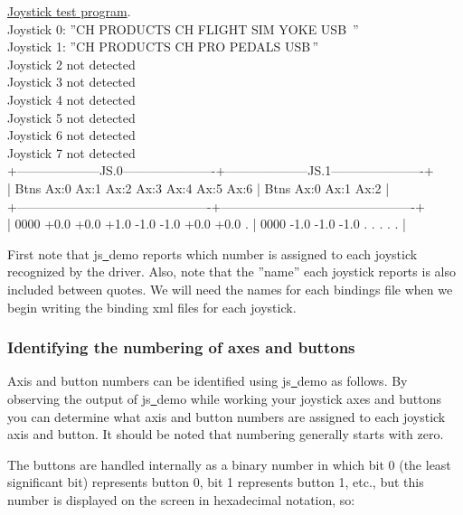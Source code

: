 \begin{ttfamily}
\tiny
\noindent
\underline{Joystick test program}.\\
Joystick 0: ''CH PRODUCTS CH FLIGHT SIM YOKE USB\, ''\\
Joystick 1: ''CH PRODUCTS CH PRO PEDALS USB\,''\\
Joystick 2 not detected\\
Joystick 3 not detected\\
Joystick 4 not detected\\
Joystick 5 not detected\\
Joystick 6 not detected\\
Joystick 7 not detected\\
+--------------------JS.0----------------------+--------------------JS.1----------------------+\\
| Btns Ax:0 Ax:1 Ax:2 Ax:3 Ax:4 Ax:5 Ax:6      | Btns Ax:0 Ax:1 Ax:2                          |\\
+----------------------------------------------+----------------------------------------------+\\
| 0000 +0.0 +0.0 +1.0 -1.0 -1.0 +0.0 +0.0   .  | 0000 -1.0 -1.0 -1.0   .    .    .    .    .  |\\
\end{ttfamily}

\noindent
First note that js\underline{~}demo reports which number is assigned to each joystick recognized by the driver.  Also, note that the ''name'' each joystick reports is also included between quotes.  We will need the names for each bindings file when we begin writing the binding xml files for each joystick.

\subsubsection{Identifying the numbering of axes and buttons\label{identifying}}
Axis and button numbers can be identified using js\underline{~}demo as follows. By observing the output of js\underline{~}demo while working your joystick axes and buttons you can determine what axis and button numbers are assigned to each joystick axis and button. It should be noted that numbering generally starts with zero. 

The buttons are handled internally as a binary number in which bit 0 (the least significant bit) represents button 0, bit 1 represents button 1, etc., but this number is displayed on the screen in hexadecimal notation, so:
\medskip

